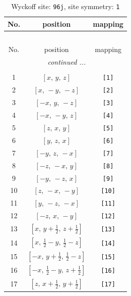 \documentclass[fleqn,8pt]{jsarticle}
\begin{document}
\begin{longtable}{ccc}
\caption{Wyckoff site: {\tt 96j}, site symmetry: {\tt 1}}
 \\
 \hline \hline
No. & position & mapping \\ \hline \endfirsthead

\multicolumn{2}{l}{\tablename\ \thetable{}} \\
 \hline \hline
No. & position & mapping \\ \hline \endhead

 \hline \hline
\multicolumn{2}{r}{\footnotesize\it continued ...} \\ \endfoot

 \hline \hline
\multicolumn{2}{r}{} \\ \endlastfoot

1 & $\left[ x,\, y,\, z \right]$ & {\tt [1]} \\ \hline
2 & $\left[ x,\, - y,\, - z \right]$ & {\tt [2]} \\ \hline
3 & $\left[ - x,\, y,\, - z \right]$ & {\tt [3]} \\ \hline
4 & $\left[ - x,\, - y,\, z \right]$ & {\tt [4]} \\ \hline
5 & $\left[ z,\, x,\, y \right]$ & {\tt [5]} \\ \hline
6 & $\left[ y,\, z,\, x \right]$ & {\tt [6]} \\ \hline
7 & $\left[ - y,\, z,\, - x \right]$ & {\tt [7]} \\ \hline
8 & $\left[ - z,\, - x,\, y \right]$ & {\tt [8]} \\ \hline
9 & $\left[ - y,\, - z,\, x \right]$ & {\tt [9]} \\ \hline
10 & $\left[ z,\, - x,\, - y \right]$ & {\tt [10]} \\ \hline
11 & $\left[ y,\, - z,\, - x \right]$ & {\tt [11]} \\ \hline
12 & $\left[ - z,\, x,\, - y \right]$ & {\tt [12]} \\ \hline
13 & $\left[ x,\, y + \frac{1}{2},\, z + \frac{1}{2} \right]$ & {\tt [13]} \\ \hline
14 & $\left[ x,\, \frac{1}{2} - y,\, \frac{1}{2} - z \right]$ & {\tt [14]} \\ \hline
15 & $\left[ - x,\, y + \frac{1}{2},\, \frac{1}{2} - z \right]$ & {\tt [15]} \\ \hline
16 & $\left[ - x,\, \frac{1}{2} - y,\, z + \frac{1}{2} \right]$ & {\tt [16]} \\ \hline
17 & $\left[ z,\, x + \frac{1}{2},\, y + \frac{1}{2} \right]$ & {\tt [17]} \\ \hline

\end{longtable}
\end{document}
